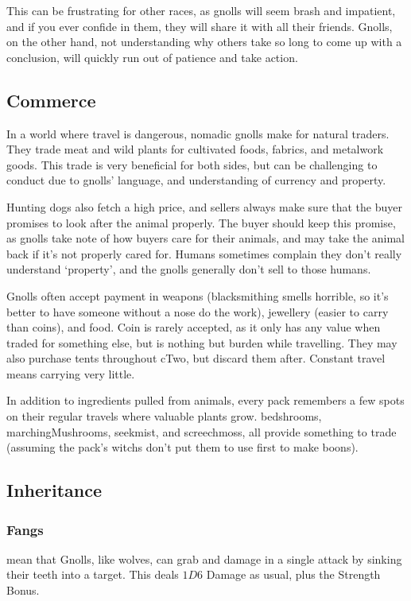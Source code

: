 This can be frustrating for other races, as gnolls will seem brash and impatient, and if you ever confide in them, they will share it with all their friends. Gnolls, on the other hand, not understanding why others take so long to come up with a conclusion, will quickly run out of patience and take action.

\subsection{Commerce}

In a world where travel is dangerous, nomadic gnolls make for natural traders. They trade meat and wild plants for cultivated foods, fabrics, and metalwork goods. This trade is very beneficial for both sides, but can be challenging to conduct due to gnolls' language, and understanding of currency and property.

Hunting dogs also fetch a high price, and sellers always make sure that the buyer promises to look after the animal properly.
The buyer should keep this promise, as gnolls take note of how buyers care for their animals, and may take the animal back if it's not properly cared for.
Humans sometimes complain they don't really understand `property', and the gnolls generally don't sell to those humans.

Gnolls often accept payment in weapons (blacksmithing smells horrible, so it's better to have someone without a nose do the work), jewellery (easier to carry than \glspl{coin}), and food.
Coin is rarely accepted, as it only has any value when traded for something else, but is nothing but burden while travelling.
They may also purchase tents throughout \gls{cTwo}, but discard them after.
Constant travel means carrying very little.

In addition to \glspl{ingredient} pulled from animals, every pack remembers a few spots on their regular travels where valuable plants grow.
\Glspl{bedshroom}, \glspl{marchingMushroom}, seekmist, and screechmoss, all provide something to trade (assuming the pack's \glspl{witch} don't put them to use first to make \glspl{boon}).

\subsection{Inheritance}

\subsubsection[Teeth: grab and grapple in a single manoeuvre]{Fangs}
\label{gnollishInheritance}
mean that Gnolls, like wolves, can grab and damage in a single attack by sinking their teeth into a target.
This deals $1D6$ Damage as usual, plus the Strength Bonus.

